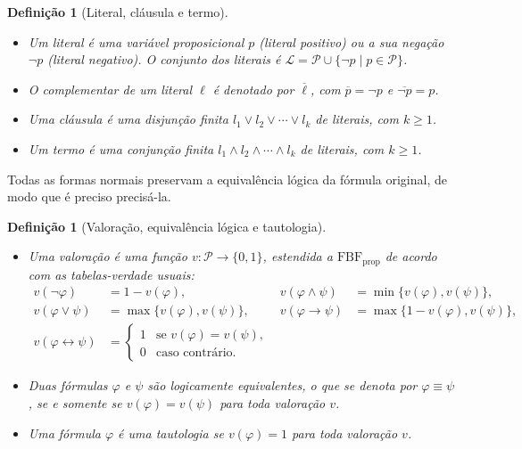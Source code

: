 \documentclass[12pt,a4paper,oneside]{report}
\theoremstyle{tituloplain}
\theoremstyle{titulodef}
\newtheorem{definicao}[teorema]{Definição}
\begin{document}
\begin{definicao}[Literal, cláusula e termo]\label{def:literal}
\leavevmode\vspace{-0.6\baselineskip}
\begin{itemize}
  \item Um \emph{literal} é uma variável proposicional $p$ (literal positivo) ou a sua negação $\neg p$ (literal negativo). O conjunto dos literais é $\mathcal{L}=\mathcal{P}\cup\{\neg p\mid p\in\mathcal{P}\}$.
  \item O \emph{complementar} de um literal $\ell$ é denotado por $\overline{\ell}$, com $\overline{p}=\neg p$ e $\overline{\neg p}=p$.
  \item Uma \emph{cláusula} é uma disjunção finita $l_1\vee l_2\vee\cdots\vee l_k$ de literais, com $k\geq 1$.
  \item Um \emph{termo} é uma conjunção finita $l_1\wedge l_2\wedge\cdots\wedge l_k$ de literais, com $k\geq 1$.
\end{itemize}
\end{definicao}

Todas as formas normais preservam a equivalência lógica da fórmula original, de modo que é preciso precisá-la.

\begin{definicao}[Valoração, equivalência lógica e tautologia]\label{def:equivalencia}
\leavevmode\vspace{-0.6\baselineskip}
\begin{itemize}
  \item Uma \emph{valoração} é uma função $v\colon\mathcal{P}\to\{0,1\}$, estendida a $\mathrm{FBF}_{\mathrm{prop}}$ de acordo com as tabelas-verdade usuais:
  \begin{align*}
    v(\neg\varphi)&=1-v(\varphi), & v(\varphi\wedge\psi)&=\min\{v(\varphi),v(\psi)\},\\
    v(\varphi\vee\psi)&=\max\{v(\varphi),v(\psi)\}, & v(\varphi\rightarrow\psi)&=\max\{1-v(\varphi),v(\psi)\},\\
    v(\varphi\leftrightarrow\psi)&=\begin{cases}1&\text{se }v(\varphi)=v(\psi),\\0&\text{caso contrário.}\end{cases}
  \end{align*}
  \item Duas fórmulas $\varphi$ e $\psi$ são \emph{logicamente equivalentes}, o que se denota por $\varphi\equiv\psi$, se e somente se $v(\varphi)=v(\psi)$ para toda valoração $v$.
  \item Uma fórmula $\varphi$ é uma \emph{tautologia} se $v(\varphi)=1$ para toda valoração $v$.
\end{itemize}
\end{definicao}
\end{document}
